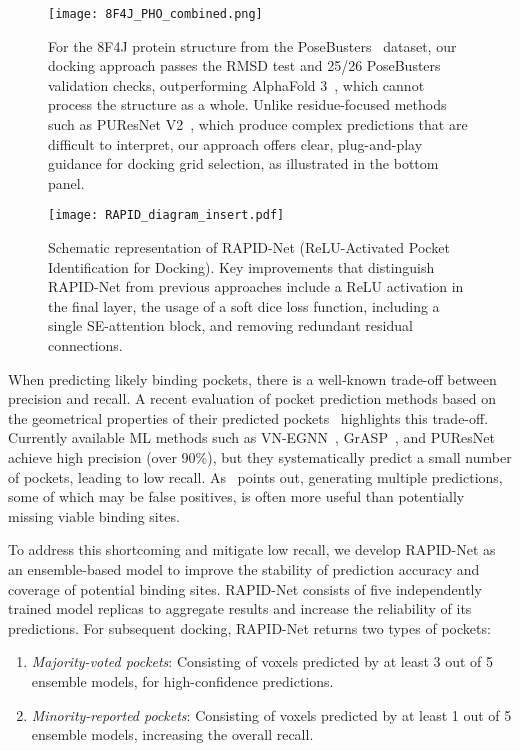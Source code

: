\documentclass[10pt,conference]{IEEEtran}
\begin{document}
\begin{figure*}[]{}
  \centering
  \texttt{[image: 8F4J\_PHO\_combined.png]}
  \caption{For the 8F4J protein structure from the PoseBusters~\cite{Buttenschoen2024} dataset, our docking approach passes the RMSD test and 25/26 PoseBusters~\cite{Buttenschoen2024} validation checks, outperforming AlphaFold 3~\cite{abramson2024accurate}, which cannot process the structure as a whole. Unlike residue-focused methods such as PUResNet V2~\cite{jeevan2024puresnetv2}, which produce complex predictions that are difficult to interpret, our approach offers clear, plug-and-play guidance for docking grid selection, as illustrated in the bottom panel.}
  \label{8F4J_PHO_combined_Fig}
\end{figure*}

\begin{figure*}[]{}
  \centering
  \texttt{[image: RAPID\_diagram\_insert.pdf]}
  \caption{Schematic representation of RAPID-Net (ReLU-Activated Pocket Identification for Docking). Key improvements that distinguish RAPID-Net from previous approaches include a ReLU activation in the final layer, the usage of a soft dice loss function, including a single SE-attention block, and removing redundant residual connections.}
  \label{RAPID_Fig}
\end{figure*}

When predicting likely binding pockets, there is a well-known trade-off between precision and recall. A recent evaluation of pocket prediction methods based on the geometrical properties of their predicted pockets~\cite{utges2024comparative} highlights this trade-off. Currently available ML methods such as VN-EGNN~\cite{sestak2024vn_egnn}, GrASP~\cite{smith2024graph}, and PUResNet~\cite{kandel2021puresnet} achieve high precision (over 90\%), but they systematically predict a small number of pockets, leading to low recall. As~\cite{utges2024comparative} points out, generating multiple predictions, some of which may be false positives, is often more useful than potentially missing viable binding sites.

To address this shortcoming and mitigate low recall, we develop RAPID-Net as an ensemble-based model to improve the stability of prediction accuracy and coverage of potential binding sites. RAPID-Net consists of five independently trained model replicas to aggregate results and increase the reliability of its predictions. For subsequent docking, RAPID-Net returns two types of pockets:

\begin{enumerate}
    \item \textit{Majority-voted pockets}: Consisting of voxels predicted by at least 3 out of 5 ensemble models, for high-confidence predictions.
    
    \item \textit{Minority-reported pockets}: Consisting of voxels predicted by at least 1 out of 5 ensemble models, increasing the overall recall.
\end{enumerate}
\end{document}
